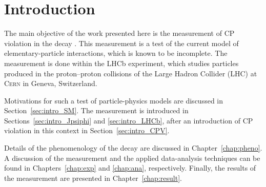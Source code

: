 \chapter{Introduction}
\label{chap:intro}

The main objective of the work presented here is the measurement of CP violation in the decay \BstoJpsiphi. This measurement is a test of
the current model of elementary-particle interactions, which is known to be incomplete. The measurement is done within the LHCb experiment,
which studies particles produced in the proton--proton collisions of the Large Hadron Collider (LHC) at \textsc{Cern} in Geneva,
Switzerland.

Motivations for such a test of particle-physics models are discussed in Section~\ref{sec:intro_SM}. The measurement is introduced in
Sections~\ref{sec:intro_Jpsiphi} and \ref{sec:intro_LHCb}, after an introduction of CP violation in this context in
Section~\ref{sec:intro_CPV}.

Details of the phenomenology of the \BstoJpsiphi{} decay are discussed in Chapter~\ref{chap:pheno}. A discussion of the  measurement and
the applied data-analysis techniques can be found in Chapters~\ref{chap:exp} and \ref{chap:ana}, respectively. Finally, the results of
the measurement are presented in Chapter~\ref{chap:result}.





